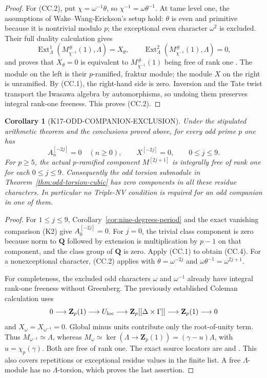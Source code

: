 \documentclass[11pt,a4paper]{article}
\newtheorem{corollary}[theorem]{Corollary}
\theoremstyle{definition}
\begin{document}
\begin{proof}
For (CC.2), put $\chi=\omega^{-1}\theta$, so
$\chi^{-1}=\omega\theta^{-1}$. At tame level one, the assumptions
of Wake--Wang-Erickson's setup hold: $\theta$ is even and primitive
because it is nontrivial modulo $p$; the exceptional even character
$\omega^2$ is excluded. Their full duality calculation gives
\[
 \operatorname{Ext}^1_\Lambda(M_{\chi^{-1}}^{\#}(1),\Lambda)
       =X_\theta,
 \qquad
 \operatorname{Ext}^2_\Lambda(M_{\chi^{-1}}^{\#}(1),\Lambda)=0,
\]
and proves that $X_\theta=0$ is equivalent to
$M_{\chi^{-1}}^{\#}(1)$ being free of rank one
\cite[\S2.1, pp.~2--3; Proposition~2.2.6 and its full proof,
p.~4]{WakeWangErickson2017}. The module on the left is their
$p$-ramified, fraktur module; the module $X$ on the right is
unramified. By (CC.1), the right-hand side is zero.
Inversion and the Tate twist transport the Iwasawa algebra by
automorphisms, so undoing them preserves integral rank-one
freeness. This proves (CC.2).
\end{proof}

\begin{corollary}[K17-ODD-COMPANION-EXCLUSION]
\label{cor:odd-companion-exclusion}
Under the stipulated arithmetic theorem and the conclusions proved
above, for every odd prime $p$ one has
\[
 A_n^{[-2j]}=0\quad(n\geq0),\qquad X^{[-2j]}=0,
                  \qquad 0\leq j\leq9.
 \tag{CC.4}
\]
For $p\geq5$, the actual $p$-ramified component $M^{[2j+1]}$ is
integrally free of rank one for each $0\leq j\leq9$.
Consequently the odd torsion submodule in
Theorem~\ref{thm:odd-torsion-cubic} has zero components in all
these residue characters. In particular no Triple-NV condition
is required for an odd companion in one of them.
\end{corollary}

\begin{proof}
For $1\leq j\leq9$, Corollary~\ref{cor:nine-degrees-period}
and the exact vanishing comparison (K2) give $A_0^{[-2j]}=0$.
For $j=0$, the trivial class component is zero because norm to
$\mathbf Q$ followed by extension is multiplication by $p-1$
on that component, and the class group of $\mathbf Q$ is zero.
Apply (CC.1) to obtain (CC.4). For a nonexceptional character,
(CC.2) applies with
$\theta=\omega^{-2j}$ and
$\omega\theta^{-1}=\omega^{2j+1}$.

For completeness, the excluded odd characters $\omega$ and
$\omega^{-1}$ already have integral rank-one freeness without
Greenberg. The previously established Coleman calculation uses
\[
0\longrightarrow\mathbf Z_p(1)\longrightarrow U_{\rm loc}
 \longrightarrow\mathbf Z_p[[\Delta\times\Gamma]]
 \longrightarrow\mathbf Z_p(1)\longrightarrow0
\]
and $X_\omega=X_{\omega^{-1}}=0$. Global minus units contribute
only the root-of-unity term. Thus $M_{\omega^{-1}}\simeq\Lambda$,
whereas
$M_\omega\simeq\ker(\Lambda\to\mathbf Z_p(1))
=(\gamma-u)\Lambda$, with $u=\chi_p(\gamma)$.
Both are free of rank one. The exact source locators are
\cite[Theorem~5.5.31, p.~148; Proposition~6.1.1,
pp.~151--152]{SharifiIwasawaNotes} and
\cite[proof of Lemma~5.2.7, p.~13]{WakeWangErickson2017}.
This also covers repetitions or exceptional residue values in
the finite list. A free $\Lambda$-module has no $\Lambda$-torsion,
which proves the last assertion.
\end{proof}
\end{document}
